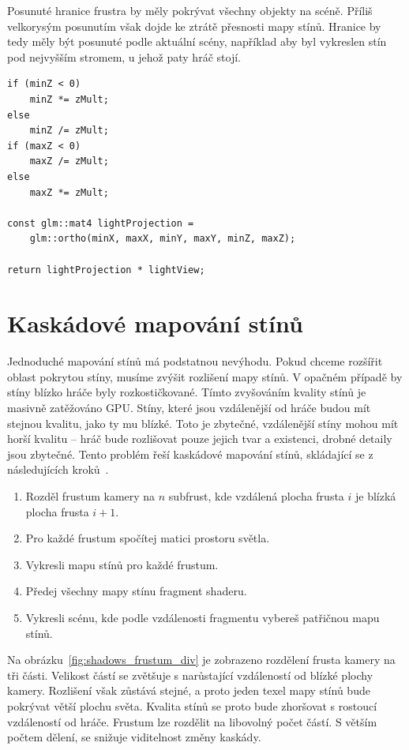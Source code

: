 \documentclass[thesis=M,czech]{FITthesis}[2019/12/23]
\begin{document}
Posunuté hranice frustra by měly pokrývat všechny objekty na scéně. Příliš velkorysým posunutím však dojde ke ztrátě přesnosti mapy stínů. Hranice by tedy měly být posunuté podle aktuální scény, například aby byl vykreslen stín pod nejvyšším stromem, u jehož paty hráč stojí.


\begin{verbatim}
if (minZ < 0) 
    minZ *= zMult;
else 
    minZ /= zMult;
if (maxZ < 0) 
    maxZ /= zMult;
else 
    maxZ *= zMult;

const glm::mat4 lightProjection = 
    glm::ortho(minX, maxX, minY, maxY, minZ, maxZ);

return lightProjection * lightView;
\end{verbatim}

\section{Kaskádové mapování stínů}

Jednoduché mapování stínů má podstatnou nevýhodu. Pokud chceme rozšířit oblast pokrytou stíny, musíme zvýšit rozlišení mapy stínů. V opačném případě by stíny blízko hráče byly rozkostičkované. Tímto zvyšováním kvality stínů je masivně zatěžováno GPU. Stíny, které jsou vzdálenější od hráče budou mít stejnou kvalitu, jako ty mu blízké. Toto je zbytečné, vzdálenější stíny mohou mít horší kvalitu – hráč bude rozlišovat pouze jejich tvar a existenci, drobné detaily jsou zbytečné. Tento problém řeší kaskádové mapování stínů, skládající se z následujících kroků~\cite{lopgl_csm}.

\begin{enumerate}
\item Rozděl frustum kamery na $n$ subfrust, kde vzdálená plocha frusta $i$ je blízká plocha frusta $i + 1$.

\item Pro každé frustum spočítej matici prostoru světla.
\item Vykresli mapu stínů pro každé frustum.
\item Předej všechny mapy stínu fragment shaderu.
\item Vykresli scénu, kde podle vzdálenosti fragmentu vybereš patřičnou mapu stínů.
\end{enumerate}

Na obrázku~\ref{fig:shadows_frustum_div} je zobrazeno rozdělení frusta kamery na tři části. Velikost částí se zvětšuje s narůstající vzdáleností od blízké plochy kamery. Rozlišení však zůstává stejné, a proto jeden texel mapy stínů bude pokrývat větší plochu světa. Kvalita stínů se proto bude zhoršovat s rostoucí vzdáleností od hráče. Frustum lze rozdělit na libovolný počet částí. S větším počtem dělení, se snižuje viditelnost změny kaskády.
\end{document}
